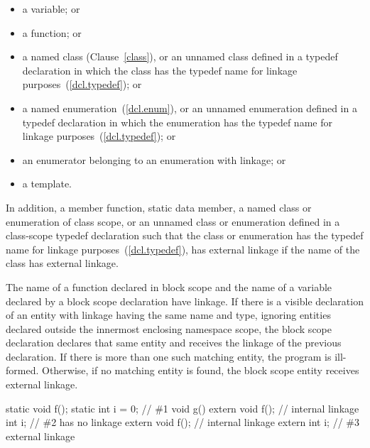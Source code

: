 \begin{itemize}
\item a variable; or

\item a function; or

\item {}%
a named class (Clause~\ref{class}), or an unnamed class defined in a
typedef declaration in which the class has the typedef name for linkage
purposes~(\ref{dcl.typedef}); or

\item {}%
a named enumeration~(\ref{dcl.enum}), or an unnamed enumeration defined
in a typedef declaration in which the enumeration has the typedef name
for linkage purposes~(\ref{dcl.typedef}); or

\item an enumerator belonging to an enumeration with linkage; or

\item a template.
\end{itemize}

\pnum
In addition, a member function, static data member, a named class or
enumeration of class scope, or an unnamed class or enumeration defined
in a class-scope typedef declaration such that the class or enumeration
has the typedef name for linkage purposes~(\ref{dcl.typedef}), has
external linkage if the name of the class has external linkage.

\pnum
The name of a function declared in block scope and the name of a variable declared by a
block scope  declaration have linkage. If there is a visible declaration
of an entity with linkage having the same name and type, ignoring entities declared
outside the innermost enclosing namespace scope, the block scope declaration declares
that same entity and receives the linkage of the previous declaration. If there is more
than one such matching entity, the program is ill-formed. Otherwise, if no matching
entity is found, the block scope entity receives external linkage.\enterexample

\begin{codeblock}
static void f();
static int i = 0;               // \#1
void g() {
  extern void f();              // internal linkage
  int i;                        // \#2  has no linkage
  {
    extern void f();            // internal linkage
    extern int i;               // \#3 external linkage
  }
}
\end{codeblock}

